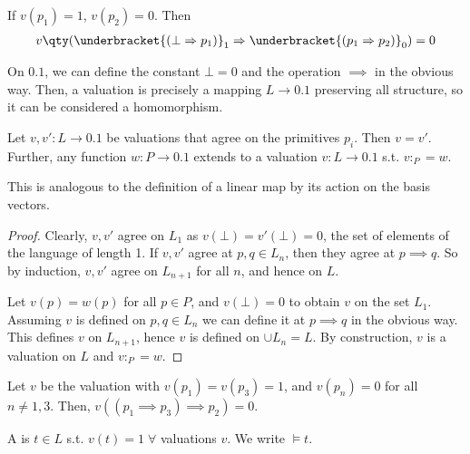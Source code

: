 \begin{example}
    If $v(p_1) = 1$, $v(p_2) = 0$.
    Then \begin{align*}
        v\qty( \underbracket{(\bot \implies p_1)}_{1} \implies \underbracket{(p_1 \implies p_2)}_{0}) = 0
    \end{align*}
\end{example}

\begin{remark}
    On $\qty{0,1}$, we can define the constant $\bot = 0$ and the operation $\implies$ in the obvious way.
    Then, a valuation is precisely a mapping $L \to \qty{0,1}$ preserving all structure, so it can be considered a homomorphism.
\end{remark}

\begin{proposition}
    Let $v, v' \colon L \to \qty{0,1}$ be valuations that agree on the primitives $p_i$.
    Then $v = v'$.
    Further, any function $w \colon P \to \qty{0,1}$ extends to a valuation $v : L \to \qty{0, 1}$ s.t. $v:_P = w$.
\end{proposition}

\begin{remark}
    This is analogous to the definition of a linear map by its action on the basis vectors.
\end{remark}

\begin{proof}
    Clearly, $v, v'$ agree on $L_1$ as $v(\bot) = v'(\bot) = 0$, the set of elements of the language of length 1.
    If $v, v'$ agree at $p, q \in L_n$, then they agree at $p \implies q$.
    So by induction, $v, v'$ agree on $L_{n+1}$ for all $n$, and hence on $L$.

    Let $v(p) = w(p)$ for all $p \in P$, and $v(\bot) = 0$ to obtain $v$ on the set $L_1$.
    Assuming $v$ is defined on $p, q \in L_n$ we can define it at $p \implies q$ in the obvious way.
    This defines $v$ on $L_{n+1}$, hence $v$ is defined on $\cup L_n = L$.
    By construction, $v$ is a valuation on $L$ and $v :_P = w$.
\end{proof}

\begin{example}
    Let $v$ be the valuation with $v(p_1) = v(p_3) = 1$, and $v(p_n) = 0$ for all $n \neq 1, 3$.
    Then, $v((p_1 \implies p_3) \implies p_2) = 0$.
\end{example}

\begin{definition}[Tautology]
    A  is $t \in L$ s.t. $v(t) = 1 \; \forall$ valuations $v$.
    We write $\models t$.
\end{definition}

